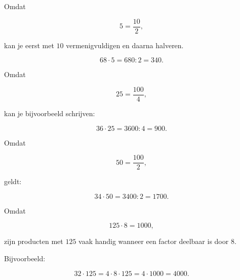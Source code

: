 \documentclass{ximera}
\begin{document}


Omdat

\[
5=\frac{10}{2},
\]

kan je eerst met \(10\) vermenigvuldigen en daarna halveren.

\begin{voorbeeld}

\[
68\cdot5
=
680:2
=
340.
\]

\end{voorbeeld}




Omdat

\[
25=\frac{100}{4},
\]

kan je bijvoorbeeld schrijven:

\[
36\cdot25
=
3600:4
=
900.
\]




Omdat

\[
50=\frac{100}{2},
\]

geldt:

\[
34\cdot50
=
3400:2
=
1700.
\]




Omdat

\[
125\cdot8=1000,
\]

zijn producten met \(125\) vaak handig wanneer een factor deelbaar is door
\(8\).

Bijvoorbeeld:

\[
32\cdot125
=
4\cdot8\cdot125
=
4\cdot1000
=
4000.
\]
\end{document}
